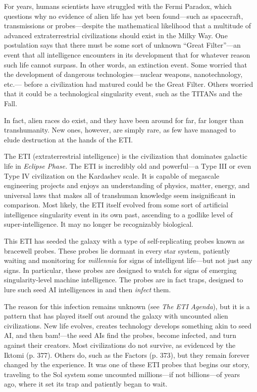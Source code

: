 For years, humans scientists have struggled with 
the Fermi Paradox, which questions why no evidence 
of alien life has yet been found—such as spacecraft, 
transmissions or probes—despite the mathematical 
likelihood that a multitude of advanced extraterrestrial 
civilizations should exist in the Milky Way. One postulation
says that there must be some sort of unknown
``Great Filter''—an event that all intelligence encounters 
in its development that for whatever reason such life 
cannot surpass. In other words, an extinction event. 
Some worried that the development of dangerous 
technologies—nuclear weapons, nanotechnology, etc.—
before a civilization had matured could be the Great 
Filter. Others worried that it could be a technological 
singularity event, such as the TITANs and the Fall.

In fact, alien races do exist, and they have been 
around for far, far longer than transhumanity. New 
ones, however, are simply rare, as few have managed 
to elude destruction at the hands of the ETI.

The ETI (extraterrestrial intelligence) is the civilization
that dominates galactic life in \textit{Eclipse Phase.}
The ETI is incredibly old and powerful—a Type III or 
even Type IV civilization on the Kardashev scale. It is 
capable of megascale engineering projects and enjoys 
an understanding of physics, matter, energy, and universal
laws that makes all of transhuman knowledge
seem insignificant in comparison. Most likely, the ETI 
itself evolved from some sort of artificial intelligence 
singularity event in its own past, ascending to a godlike
level of super-intelligence. It may no longer be
recognizably biological.

This ETI has seeded the galaxy with a type of 
self-replicating probes known as bracewell probes. 
These probes lie dormant in every star system, patiently
waiting and monitoring for \textit{millennia} for signs
of intelligent life—but not just any signs. In particular, 
these probes are designed to watch for signs of emerging
singularity-level machine intelligence. The probes
are in fact traps, designed to lure such seed AI intelligences
in and then \textit{infect} them.

The reason for this infection remains unknown 
(see  \textit{The ETI Agenda}), but it is a pattern that has 
played itself out around the galaxy with uncounted 
alien civilizations. New life evolves, creates technology
develops something akin to seed AI, and then
bam!—the seed AIs find the probes, become infected, 
and turn against their creators. Most civilizations 
do not survive, as evidenced by the Iktomi (p. 377). 
Others do, such as the Factors (p. 373), but they 
remain forever changed by the experience. 
It was one of these ETI probes that begins our 
story, traveling to the Sol system some uncounted 
millions—if not billions—of years ago, where it set its 
trap and patiently began to wait.



